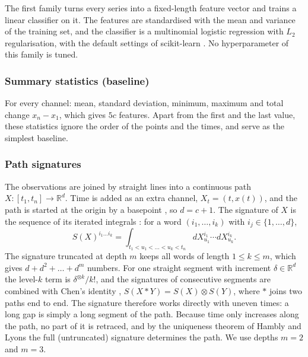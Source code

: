 The first family turns every series into a fixed-length feature vector
and trains a linear classifier on it. The features are standardised with
the mean and variance of the training set, and the classifier is a
multinomial logistic regression with $L_2$ regularisation, with the
default settings of scikit-learn \cite{pedregosa2011sklearn}. No
hyperparameter of this family is tuned.

\subsubsection*{Summary statistics (baseline)}
For every channel: mean, standard deviation, minimum, maximum and total
change $x_n - x_1$, which gives $5c$ features. Apart from the first and
the last value, these statistics ignore the order of the points and the
times, and serve as the simplest baseline.

\subsubsection*{Path signatures}
The observations are joined by straight lines into a continuous path
$X \colon [t_1, t_n] \to \mathbb{R}^d$. Time is added as an extra channel,
$X_t = (t, x(t))$, and the path is started at the origin by a basepoint
\cite{morrill2020generalised}, so $d = c + 1$. The signature of $X$ is the
sequence of its iterated integrals \cite{chen1958integration,
lyons2022sigml}: for a word $(i_1, \dots, i_k)$ with
$i_j \in \{1, \dots, d\}$,
\[
  S(X)^{i_1 \dots i_k} =
  \int_{t_1 < u_1 < \dots < u_k < t_n}
  dX^{i_1}_{u_1} \cdots dX^{i_k}_{u_k} .
\]
The signature truncated at depth $m$ keeps all words of length
$1 \le k \le m$, which gives $d + d^2 + \dots + d^m$ numbers. For one
straight segment with increment $\delta \in \mathbb{R}^d$ the level-$k$
term is $\delta^{\otimes k} / k!$, and the signatures of consecutive
segments are combined with Chen's identity
\cite{chen1958integration}, $S(X * Y) = S(X) \otimes S(Y)$, where $*$
joins two paths end to end. The signature therefore works directly with
uneven times: a long gap is simply a long segment of the path. Because
time only increases along the path, no part of it is retraced, and by the
uniqueness theorem of Hambly and Lyons \cite{hambly2010uniqueness} the
full (untruncated) signature determines the path. We use depths $m = 2$
and $m = 3$.

